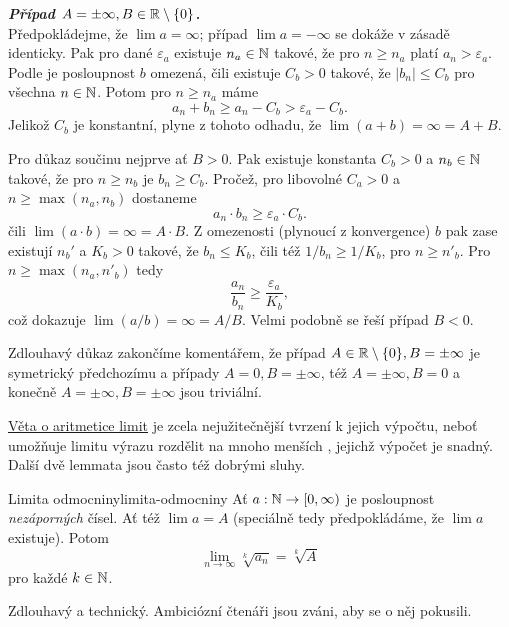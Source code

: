\begin{thmproof}
 \textbf{\emph{Případ $A = \pm \infty, B \in \mathbb{R} \setminus \{0\}$.}}\\
 Předpokládejme, že $\lim a = \infty$; případ $\lim a = -\infty$ se dokáže v
 zásadě identicky. Pak pro dané $\varepsilon_a$ existuje $n_a \in \mathbb{N}$ takové, že
 pro $n \geq n_a$ platí $a_n > \varepsilon_a$. Podle
  je posloupnost $b$ omezená, čili
 existuje $C_b > 0$ takové, že $|b_n| \leq C_b$ pro všechna $n \in \mathbb{N}$. Potom
 pro $n \geq n_a$ máme
 \[
  a_n + b_n \geq a_n - C_b > \varepsilon_a - C_b.
 \]
 Jelikož $C_b$ je konstantní, plyne z tohoto odhadu, že $\lim (a + b) = \infty =
 A + B$.

 Pro důkaz součinu nejprve ať $B > 0$. Pak existuje konstanta $C_b > 0$ a $n_b
 \in \mathbb{N}$ takové, že pro $n \geq n_b$ je $b_n \geq C_b$. Pročež, pro libovolné
 $C_a > 0$ a $n \geq \max(n_a,n_b)$ dostaneme
 \[
  a_n \cdot b_n \geq \varepsilon_a \cdot C_b.
 \]
 čili $\lim (a \cdot b) = \infty = A \cdot B$. Z omezenosti (plynoucí z
 konvergence) $b$ pak zase existují $n_b'$ a $K_b > 0$ takové, že $b_n \leq
 K_b$, čili též $1 / b_n \geq 1 / K_b$, pro $n \geq n'_b$. Pro $n \geq
 \max(n_a,n'_b)$ tedy
 \[
  \frac{a_n}{b_n} \geq \frac{\varepsilon_a}{K_b},
 \]
 což dokazuje $\lim (a / b) = \infty = A / B$. Velmi podobně se řeší případ $B <
 0$.

 Zdlouhavý důkaz zakončíme komentářem, že případ $A \in \mathbb{R} \setminus \{0\}, B =
 \pm \infty$ je symetrický předchozímu a případy $A = 0, B = \pm \infty$, též $A
 = \pm \infty, B = 0$ a konečně $A = \pm \infty, B = \pm \infty$ jsou triviální.
\end{thmproof}

\hyperref[thm:aritmetika-limit]{Věta o aritmetice limit} je zcela nejužitečnější
tvrzení k jejich výpočtu, neboť umožňuje limitu výrazu rozdělit na mnoho menších
, jejichž výpočet je snadný. Další dvě lemmata jsou často též
dobrými sluhy.

\begin{lemma}{Limita odmocniny}{limita-odmocniny}
 Ať $a:\mathbb{N} \to [0,\infty)$ je posloupnost \emph{nezáporných} čísel. Ať též
    $\lim a = A$ (speciálně tedy předpokládáme, že $\lim a$ existuje). Potom
 \[
  \lim_{n \to \infty} \sqrt[k]{a_n} = \sqrt[k]{A}
 \]
 pro každé $k \in \mathbb{N}$.
\end{lemma}
\begin{lemproof}
 Zdlouhavý a technický. Ambiciózní čtenáři jsou zváni, aby se o něj pokusili.
\end{lemproof}

